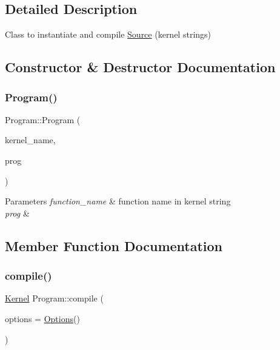 \subsection{Detailed Description}
Class to instantiate and compile \hyperlink{classyacx_1_1_source}{Source} (kernel strings) 

\subsection{Constructor \& Destructor Documentation}
\mbox{\label{classyacx_1_1_program_a70cf98f664408ede2787e4505365a82a}} 
\subsubsection{\texorpdfstring{Program()}{Program()}}
{\footnotesize\ttfamily Program\+::\+Program (\begin{DoxyParamCaption}\item[{std\+::string}]{kernel\+\_\+name,  }\item[{std\+::shared\+\_\+ptr$<$ nvrtc\+Program $>$}]{prog }\end{DoxyParamCaption})}


\begin{DoxyParams}{Parameters}
{\em function\+\_\+name} & function name in kernel string \\
\hline
{\em prog} & \\
\hline
\end{DoxyParams}


\subsection{Member Function Documentation}
\mbox{\label{classyacx_1_1_program_a2834c7f32be3bba037352a5a5e5114d3}} 
\subsubsection{\texorpdfstring{compile()}{compile()}}
{\footnotesize\ttfamily \hyperlink{classyacx_1_1_kernel}{Kernel} Program\+::compile (\begin{DoxyParamCaption}\item[{const \hyperlink{classyacx_1_1_options}{Options} \&}]{options = {\ttfamily \hyperlink{classyacx_1_1_options}{Options}()} }\end{DoxyParamCaption})}

